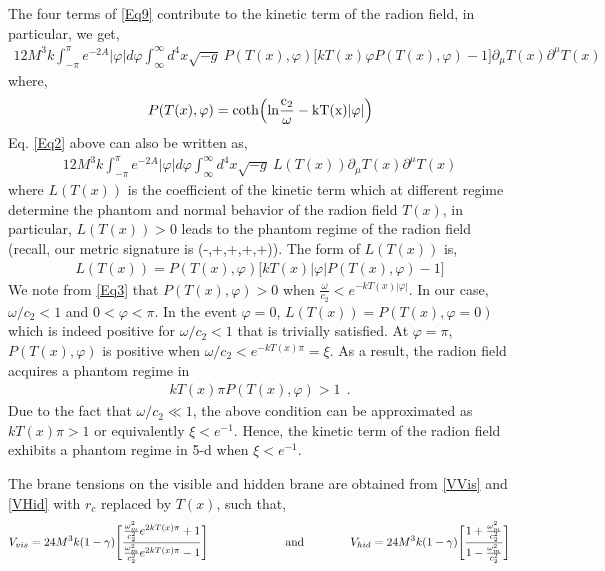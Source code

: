 \documentclass{article}
\begin{document}
The four terms of \ref{Eq9} contribute to the kinetic term of the radion field, in particular, we get,
\begin{align}
12M^3k\int_{-\pi}^{\pi} e^{-2A}|\varphi|d\varphi \int_\infty^\infty d^4 x\sqrt{-g}~ P(T(x),\varphi) 
\Big[kT(x)\varphi P(T(x),\varphi) - 1\Big]\partial_\mu T(x) \partial^\mu T(x) 
\label{Eq2}
\end{align}
where,
\begin{align}
P(T(x),\varphi)=\rm coth\Big(ln\frac{c_2}{\omega}-kT(x)|\varphi|\Big)
\label{Eq3}
\end{align} 
Eq. \ref{Eq2} above can also be written as,
\begin{align}
12M^3k\int_{-\pi}^{\pi} e^{-2A}|\varphi|d\varphi \int_\infty^\infty d^4 x\sqrt{-g}~ L(T(x)) \partial_\mu T(x) \partial^\mu T(x)
\label{Eq4}
\end{align}
where $L(T(x))$ is the coefficient of the kinetic term which at different regime determine the phantom and normal behavior of the 
radion field $T(x)$, in particular, $L(T(x)) > 0$ leads to the phantom regime of the radion field (recall, our metric signature is (-,+,+,+,+)). 
The form of $L(T(x))$ is,
\begin{align}
L(T(x))=P(T(x),\varphi) \Big[kT(x)|\varphi|P(T(x),\varphi) - 1\Big]
\end{align}
We note from \ref{Eq3} that $P(T(x),\varphi)>0$ when $\frac{\omega}{c_2}<e^{-kT(x)|\varphi|}$. 
In our case, $\omega/c_2<1$ and $0<\varphi<\pi$. In the event $\varphi=0$, $L(T(x)) = P(T(x),\varphi = 0)$ which is indeed positive for 
$\omega/c_2<1$ that is trivially satisfied. At $\varphi=\pi$, $P(T(x),\varphi)$ is positive when $\omega/c_2<e^{-kT(x)\pi}=\xi$. 
As a result, the radion field acquires a phantom regime in 
\begin{eqnarray}
 kT(x)\pi P(T(x),\varphi) > 1~~.
 \label{new1}
\end{eqnarray}
Due to the fact that $\omega/c_2 \ll 1$, the above condition can be approximated as $kT(x)\pi > 1$ or equivalently $\xi < e^{-1}$. 
Hence, the kinetic term of the radion field exhibits a phantom regime in 5-d when $\xi < e^{-1}$.


The brane tensions on the visible and hidden brane are obtained from \ref{VVis} and \ref{VHid} with $r_c$ replaced by $T(x)$, such that,
\begin{align}
V_{vis}=24M^3k(1-\gamma)\Bigg[\frac{\frac{\omega_m^2}{c_2^2}e^{2kT(x)\pi}+1}{\frac{\omega_m^2}{c_2^2}e^{2kT(x)\pi}-1}\Bigg] ~~~~~~~~~~~~~~~~~~~~{\rm and} ~~~~~~~~~~~~V_{hid}=24M^3k(1-\gamma)\Bigg[\frac{1+\frac{\omega_m^2}{c_2^2}}{1-\frac{\omega_m^2}{c_2^2}}\Bigg]  \label{Eq10}
\end{align}
\end{document}
